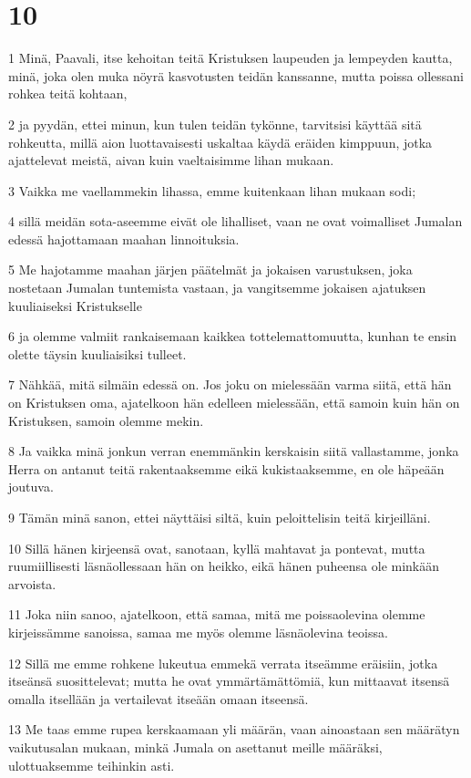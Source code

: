 \chapter{10}

\par 1 Minä, Paavali, itse kehoitan teitä Kristuksen laupeuden ja lempeyden kautta, minä, joka olen muka nöyrä kasvotusten teidän kanssanne, mutta poissa ollessani rohkea teitä kohtaan,
\par 2 ja pyydän, ettei minun, kun tulen teidän tykönne, tarvitsisi käyttää sitä rohkeutta, millä aion luottavaisesti uskaltaa käydä eräiden kimppuun, jotka ajattelevat meistä, aivan kuin vaeltaisimme lihan mukaan.
\par 3 Vaikka me vaellammekin lihassa, emme kuitenkaan lihan mukaan sodi;
\par 4 sillä meidän sota-aseemme eivät ole lihalliset, vaan ne ovat voimalliset Jumalan edessä hajottamaan maahan linnoituksia.
\par 5 Me hajotamme maahan järjen päätelmät ja jokaisen varustuksen, joka nostetaan Jumalan tuntemista vastaan, ja vangitsemme jokaisen ajatuksen kuuliaiseksi Kristukselle
\par 6 ja olemme valmiit rankaisemaan kaikkea tottelemattomuutta, kunhan te ensin olette täysin kuuliaisiksi tulleet.
\par 7 Nähkää, mitä silmäin edessä on. Jos joku on mielessään varma siitä, että hän on Kristuksen oma, ajatelkoon hän edelleen mielessään, että samoin kuin hän on Kristuksen, samoin olemme mekin.
\par 8 Ja vaikka minä jonkun verran enemmänkin kerskaisin siitä vallastamme, jonka Herra on antanut teitä rakentaaksemme eikä kukistaaksemme, en ole häpeään joutuva.
\par 9 Tämän minä sanon, ettei näyttäisi siltä, kuin peloittelisin teitä kirjeilläni.
\par 10 Sillä hänen kirjeensä ovat, sanotaan, kyllä mahtavat ja pontevat, mutta ruumiillisesti läsnäollessaan hän on heikko, eikä hänen puheensa ole minkään arvoista.
\par 11 Joka niin sanoo, ajatelkoon, että samaa, mitä me poissaolevina olemme kirjeissämme sanoissa, samaa me myös olemme läsnäolevina teoissa.
\par 12 Sillä me emme rohkene lukeutua emmekä verrata itseämme eräisiin, jotka itseänsä suosittelevat; mutta he ovat ymmärtämättömiä, kun mittaavat itsensä omalla itsellään ja vertailevat itseään omaan itseensä.
\par 13 Me taas emme rupea kerskaamaan yli määrän, vaan ainoastaan sen määrätyn vaikutusalan mukaan, minkä Jumala on asettanut meille määräksi, ulottuaksemme teihinkin asti.
